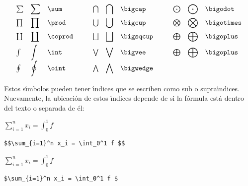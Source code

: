 \begin{table}
$$
\begin{array}{lll@{\hspace{1cm}}lll@{\hspace{1cm}}lll}
\sum & {\displaystyle \sum} & \verb+\sum+ &
\bigcap & {\displaystyle \bigcap} & \verb+\bigcap+ &
\bigodot & {\displaystyle \bigodot} & \verb+\bigodot+ \\[.2cm]
\prod & {\displaystyle \prod} & \verb+\prod+ &
\bigcup & {\displaystyle \bigcup} & \verb+\bigcup+ &
\bigotimes & {\displaystyle \bigotimes} & \verb+\bigotimes+ \\[.2cm]
\coprod & {\displaystyle \coprod} & \verb+\coprod+ &
\bigsqcup & {\displaystyle \bigsqcup} & \verb+\bigsqcup+ &
\bigoplus & {\displaystyle \bigoplus} & \verb+\bigoplus+ \\[.2cm]
\int & {\displaystyle \int} & \verb+\int+ &
\bigvee & {\displaystyle \bigvee} & \verb+\bigvee+ &
\bigoplus & {\displaystyle \bigoplus} & \verb+\bigoplus+ \\[.2cm]
\oint & {\displaystyle \oint} & \verb+\oint+ &
\bigwedge & {\displaystyle \bigwedge} & \verb+\bigwedge+ \\
\end{array}
$$
\caption{S{\'\i}mbolos de tama{\~n}o variable.}
\label{variable}
\end{table}
Estos s{\'\i}mbolos pueden tener {\'\i}ndices que se escriben como sub o
supra{\'\i}ndices. Nuevamente, la ubicaci{\'o}n de estos {\'\i}ndices depende de si
la f{\'o}rmula est{\'a} dentro del texto o separada de {\'e}l:

\vspace{.3cm}
{\small
\begin{minipage}[t]{5cm}
$\displaystyle \sum_{i=1}^n x_i = \int_0^1 f $
\end{minipage}
\hspace{.8cm}
\begin{minipage}[t]{5cm}
\begin{verbatim}
$$\sum_{i=1}^n x_i = \int_0^1 f $$
\end{verbatim}
\end{minipage}

\vspace{.3cm}
\begin{minipage}[t]{5cm}
$\sum_{i=1}^n x_i = \int_0^1 f $
\end{minipage}
\hspace{.8cm}
\begin{minipage}[t]{5cm}
\begin{verbatim}
$\sum_{i=1}^n x_i = \int_0^1 f $
\end{verbatim}
\end{minipage}
}

